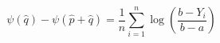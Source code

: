 

\[
\psi(\hat{q}) - \psi(\hat{p} + \hat{q}) = \frac{1}{n} \sum_{i=1}^{n}{\log(\frac{b - Y_i}{b - a})}
\]



